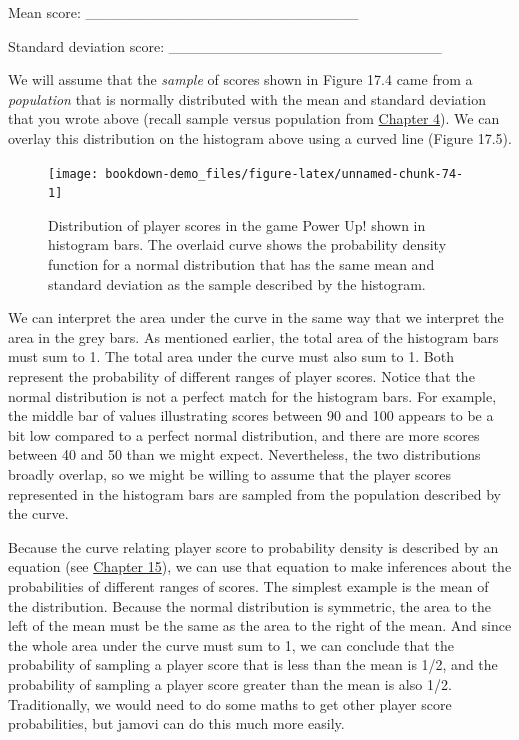 \documentclass[
]{scrbook}
\begin{document}
Mean score: \_\_\_\_\_\_\_\_\_\_\_\_\_\_\_\_\_\_\_\_\_\_\_\_\_\_

Standard deviation score: \_\_\_\_\_\_\_\_\_\_\_\_\_\_\_\_\_\_\_\_\_\_\_\_\_\_

We will assume that the \emph{sample} of scores shown in Figure 17.4 came from a \emph{population} that is normally distributed with the mean and standard deviation that you wrote above (recall sample versus population from \protect\hyperlink{Chapter_4}{Chapter 4}).
We can overlay this distribution on the histogram above using a curved line (Figure 17.5).

\begin{figure}
\texttt{[image: bookdown-demo\_files/figure-latex/unnamed-chunk-74-1]} \caption{Distribution of player scores in the game Power Up! shown in histogram bars. The overlaid curve shows the probability density function for a normal distribution that has the same mean and standard deviation as the sample described by the histogram.}\label{fig:unnamed-chunk-74}
\end{figure}

We can interpret the area under the curve in the same way that we interpret the area in the grey bars.
As mentioned earlier, the total area of the histogram bars must sum to 1.
The total area under the curve must also sum to 1.
Both represent the probability of different ranges of player scores.
Notice that the normal distribution is not a perfect match for the histogram bars.
For example, the middle bar of values illustrating scores between 90 and 100 appears to be a bit low compared to a perfect normal distribution, and there are more scores between 40 and 50 than we might expect.
Nevertheless, the two distributions broadly overlap, so we might be willing to assume that the player scores represented in the histogram bars are sampled from the population described by the curve.

Because the curve relating player score to probability density is described by an equation (see \protect\hyperlink{Chapter_15}{Chapter 15}), we can use that equation to make inferences about the probabilities of different ranges of scores.
The simplest example is the mean of the distribution.
Because the normal distribution is symmetric, the area to the left of the mean must be the same as the area to the right of the mean.
And since the whole area under the curve must sum to 1, we can conclude that the probability of sampling a player score that is less than the mean is 1/2, and the probability of sampling a player score greater than the mean is also 1/2.
Traditionally, we would need to do some maths to get other player score probabilities, but jamovi can do this much more easily.
\end{document}
